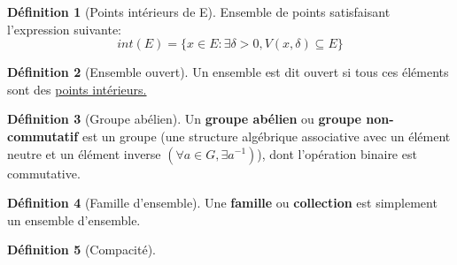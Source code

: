 \documentclass[12pt]{book}
\theoremstyle{definition}
\newtheorem{definition}{Définition}[section]
\begin{document}
\begin{definition}[Points intérieurs de E]
    \label{def:point_int}
    Ensemble de points satisfaisant l'expression
    suivante: $$int(E) = \{ x \in E : \exists \delta > 0, V(x, \delta) \subseteq E \} $$
\end{definition}

\begin{definition}[Ensemble ouvert]
    \label{def:ensemble_ouvert}
    Un ensemble est dit ouvert si tous ces éléments sont des \hyperref[def:point_int]{points intérieurs.}
\end{definition}

\begin{definition}[Groupe abélien]
    \label{def:groupe_abelien}
    Un \textbf{groupe abélien} ou \textbf{groupe non-commutatif} est un groupe
    (une structure algébrique associative avec un élément neutre et un élément inverse $(\forall a \in G, \exists a^{-1})$), 
    dont l'opération binaire est commutative.
\end{definition}

\begin{definition}[Famille d'ensemble]
    \label{def:famille}
    Une \textbf{famille} ou \textbf{collection} est simplement un ensemble d'ensemble.
\end{definition}

\begin{definition}[Compacité]
    
\end{definition}
\end{document}
